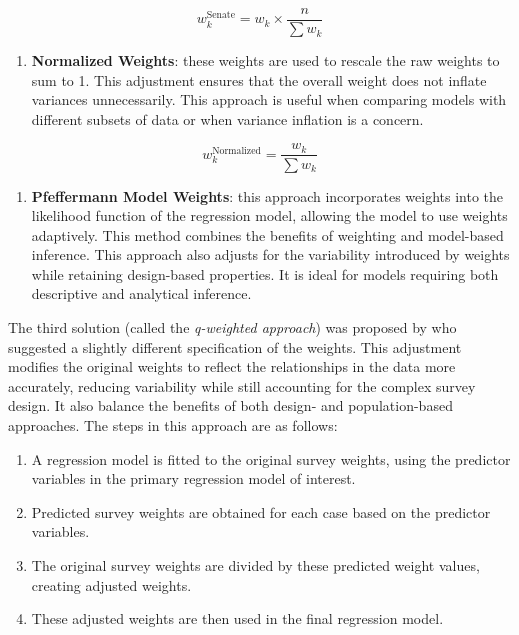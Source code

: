 \documentclass[
  12pt,
]{book}
\providecommand{\tightlist}{%
  \setlength{\itemsep}{0pt}\setlength{\parskip}{0pt}}
\begin{document}
\[
w^{\text{Senate}}_k = w_k \times \frac{n}{\sum w_k}
\]

\begin{enumerate}
\def\labelenumi{\arabic{enumi}.}
\setcounter{enumi}{1}
\tightlist
\item
  \textbf{Normalized Weights}: these weights are used to rescale the raw weights to sum to 1. This adjustment ensures that the overall weight does not inflate variances unnecessarily. This approach is useful when comparing models with different subsets of data or when variance inflation is a concern.
\end{enumerate}

\[
w^{\text{Normalized}}_k = \frac{w_k}{\sum w_k}
\]

\begin{enumerate}
\def\labelenumi{\arabic{enumi}.}
\setcounter{enumi}{2}
\tightlist
\item
  \textbf{Pfeffermann Model Weights}: this approach incorporates weights into the likelihood function of the regression model, allowing the model to use weights adaptively. This method combines the benefits of weighting and model-based inference. This approach also adjusts for the variability introduced by weights while retaining design-based properties. It is ideal for models requiring both descriptive and analytical inference.
\end{enumerate}

The third solution (called the \emph{q-weighted approach}) was proposed by \citet{pfeffermann2011modelling} who suggested a slightly different specification of the weights. This adjustment modifies the original weights to reflect the relationships in the data more accurately, reducing variability while still accounting for the complex survey design. It also balance the benefits of both design- and population-based approaches. The steps in this approach are as follows:

\begin{enumerate}
\def\labelenumi{\arabic{enumi}.}
\item
  A regression model is fitted to the original survey weights, using the predictor variables in the primary regression model of interest.
\item
  Predicted survey weights are obtained for each case based on the predictor variables.
\item
  The original survey weights are divided by these predicted weight values, creating adjusted weights.
\item
  These adjusted weights are then used in the final regression model.
\end{enumerate}
\end{document}
